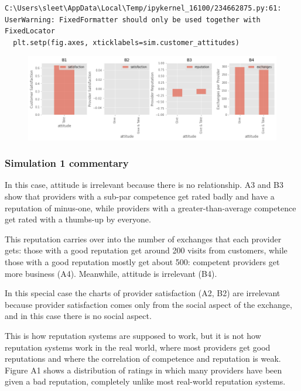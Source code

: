 \documentclass[
  letterpaper,
  DIV=11,
  numbers=noendperiod]{scrartcl}
\begin{document}
\begin{verbatim}
C:\Users\sleet\AppData\Local\Temp/ipykernel_16100/234662875.py:61: UserWarning: FixedFormatter should only be used together with FixedLocator
  plt.setp(fig.axes, xticklabels=sim.customer_attitudes)
\end{verbatim}

\begin{figure}[H]

{\centering \includegraphics{provider-reputation_files/figure-pdf/cell-11-output-3.png}

}

\end{figure}

\hypertarget{simulation-1-commentary}{%
\subsubsection{Simulation 1 commentary}\label{simulation-1-commentary}}

In this case, attitude is irrelevant because there is no relationship.
A3 and B3 show that providers with a sub-par competence get rated badly
and have a reputation of minus-one, while providers with a
greater-than-average competence get rated with a thumbs-up by everyone.

This reputation carries over into the number of exchanges that each
provider gets: those with a good reputation get around 200 visits from
customers, while those with a good reputation mostly get about 500:
competent providers get more business (A4). Meanwhile, attitude is
irrelevant (B4).

In this special case the charts of provider satisfaction (A2, B2) are
irrelevant because provider satisfaction comes only from the social
aspect of the exchange, and in this case there is no social aspect.

This is how reputation systems are supposed to work, but it is not how
reputation systems work in the real world, where most providers get good
reputations and where the correlation of competence and reputation is
weak. Figure A1 shows a distribution of ratings in which many providers
have been given a bad reputation, completely unlike most real-world
reputation systems.
\end{document}
